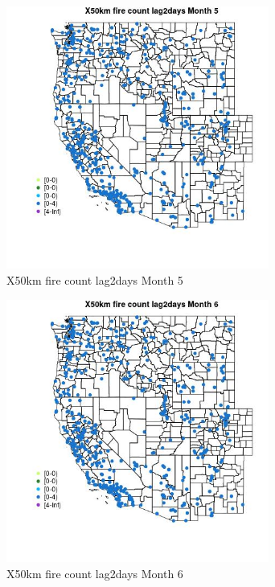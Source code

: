 \begin{figure} 
\centering  
\includegraphics[width=0.77\textwidth]{Code_Outputs/Report_ML_input_PM25_Step4_part_e_de_duplicated_aves_compiled_2019-05-14wNAs_MapObsMo5X50km_fire_count_lag2days.jpg} 
\caption{\label{fig:Report_ML_input_PM25_Step4_part_e_de_duplicated_aves_compiled_2019-05-14wNAsMapObsMo5X50km_fire_count_lag2days}X50km fire count lag2days Month 5} 
\end{figure} 
 

\begin{figure} 
\centering  
\includegraphics[width=0.77\textwidth]{Code_Outputs/Report_ML_input_PM25_Step4_part_e_de_duplicated_aves_compiled_2019-05-14wNAs_MapObsMo6X50km_fire_count_lag2days.jpg} 
\caption{\label{fig:Report_ML_input_PM25_Step4_part_e_de_duplicated_aves_compiled_2019-05-14wNAsMapObsMo6X50km_fire_count_lag2days}X50km fire count lag2days Month 6} 
\end{figure} 
 

